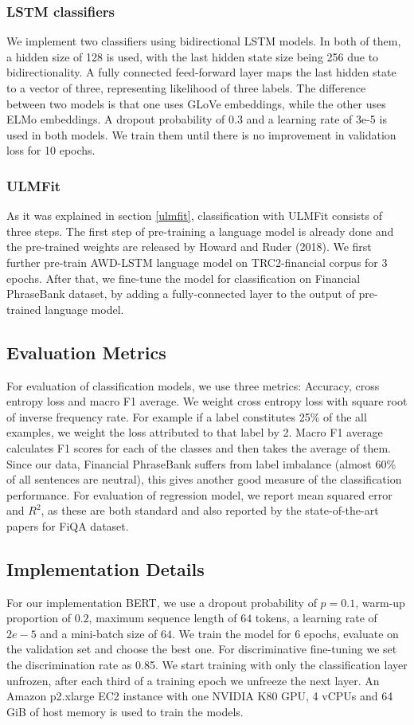 \documentclass[../main.tex]{subfiles}
\begin{document}
\subsubsection{LSTM classifiers}
We implement two classifiers using bidirectional LSTM models. In both of them, a hidden size of 128 is used, with the last hidden state size being 256 due to bidirectionality. A fully connected feed-forward layer maps the last hidden state to a vector of three, representing likelihood of three labels. The difference between two models is that one uses GLoVe embeddings, while the other uses ELMo embeddings. A dropout probability of 0.3 and a learning rate of 3e-5 is used in both models. We train them until there is no improvement in validation loss for 10 epochs.

\subsubsection{ULMFit}
As it was explained in section \ref{ulmfit}, classification with ULMFit consists of three steps. The first step of pre-training a language model is already done and the pre-trained weights are released by Howard and Ruder (2018). We first further pre-train AWD-LSTM language model on TRC2-financial corpus for 3 epochs. After that, we fine-tune the model for classification on Financial PhraseBank dataset, by adding a fully-connected layer to the output of pre-trained language model. 

\subsection{Evaluation Metrics} \label{evaluation_metrics}
For evaluation of classification models, we use three metrics: Accuracy, cross entropy loss and macro F1 average. We weight cross entropy loss with square root of inverse frequency rate. For example if a label constitutes 25\% of the all examples, we weight the loss attributed to that label by 2. Macro F1 average calculates F1 scores for each of the classes and then takes the average of them. Since our data, Financial PhraseBank suffers from label imbalance (almost 60\% of all sentences are neutral), this gives another good measure of the classification performance. For evaluation of regression model, we report mean squared error and $R^2$, as these are both standard and also reported by the state-of-the-art papers for FiQA dataset.

\subsection{Implementation Details} \label{implementation_details}
For our implementation BERT, we use a dropout probability of $p=0.1$, warm-up proportion of $0.2$, maximum sequence length of $64$ tokens, a learning rate of $2e-5$ and a mini-batch size of $64$. We train the model for 6 epochs, evaluate on the validation set and choose the best one. For discriminative fine-tuning we set the discrimination rate as 0.85. We start training with only the classification layer unfrozen, after each third of a training epoch we unfreeze the next layer. An Amazon p2.xlarge EC2 instance with one NVIDIA K80 GPU, 4 vCPUs and 64 GiB of host memory is used to train the models. 
\end{document}
